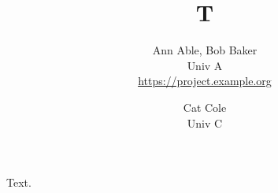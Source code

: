 \documentclass{article}
\title{T}
\author{Ann Able, Bob Baker \\ Univ A \\ \url{https://project.example.org} \and Cat Cole \\ Univ C}
\begin{document}
\maketitle
Text.
\end{document}
